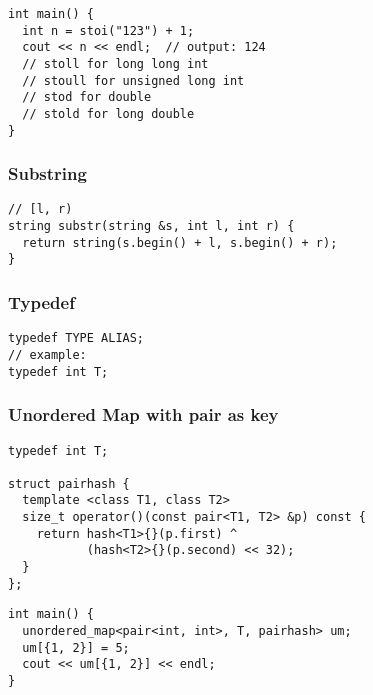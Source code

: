 \documentclass[twoside]{article}
\newcommand{\fileTitleStyle}{\large\underline}
\begin{document}
\begin{multicols*}{2}
\begin{verbatim}
int main() {
  int n = stoi("123") + 1;
  cout << n << endl;  // output: 124
  // stoll for long long int
  // stoull for unsigned long int
  // stod for double
  // stold for long double
}
\end{verbatim}

\subsubsectionfont{\centering\bfseries\Large}
\subsubsectionfont{\fileTitleStyle}
\subsubsection*{Substring}
\begin{verbatim}
// [l, r)
string substr(string &s, int l, int r) {
  return string(s.begin() + l, s.begin() + r);
}
\end{verbatim}

\subsubsectionfont{\centering\bfseries\Large}
\subsubsectionfont{\fileTitleStyle}
\subsubsection*{Typedef}
\begin{verbatim}
typedef TYPE ALIAS;
// example:
typedef int T;
\end{verbatim}

\subsubsectionfont{\centering\bfseries\Large}
\subsubsectionfont{\fileTitleStyle}
\subsubsection*{Unordered Map with pair as key}
\begin{verbatim}
typedef int T;

struct pairhash {
  template <class T1, class T2>
  size_t operator()(const pair<T1, T2> &p) const {
    return hash<T1>{}(p.first) ^
           (hash<T2>{}(p.second) << 32);
  }
};
\end{verbatim}
\vspace{-12pt}
\begin{verbatim}
int main() {
  unordered_map<pair<int, int>, T, pairhash> um;
  um[{1, 2}] = 5;
  cout << um[{1, 2}] << endl;
}
\end{verbatim}

\subsectionfont{\centering\bfseries\LARGE}
\vspace{0em}

\end{multicols*}
\end{document}
